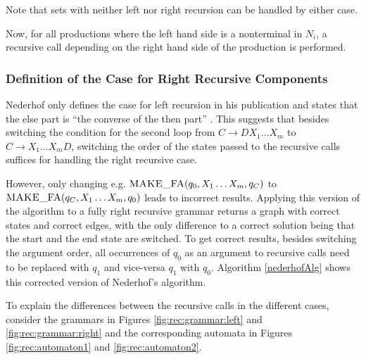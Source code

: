 Note that sets with neither left nor right recursion can be handled by either case.

Now, for all productions where the left hand side is a nonterminal in $N_i$, a recursive call depending on the right hand side of the production is performed. 

\subsubsection{Definition of the Case for Right Recursive Components}

Nederhof only defines the case for left recursion in his publication and states that the else part is \enquote{the converse of the then part} \cite{nederhof}. This suggests that besides switching the condition for the second loop from $C \rightarrow DX_1 \ldots X_m$ to  $C \rightarrow X_1 \ldots X_mD$, switching the order of the states passed to the recursive calls suffices for handling the right recursive case.

However, only changing e.g. $\textproc{MAKE\_FA}(q_0, X_1 \ldots X_m, q_C)$ to $\textproc{MAKE\_FA}(q_C, X_1 \ldots X_m, q_0)$ leads to incorrect results. Applying this version of the algorithm to a fully right recursive grammar returns a graph with correct states and correct edges, with the only difference to a correct solution being that the start and the end state are switched. To get correct results, besides switching the argument order, all occurrences of $q_0$ as an argument to recursive calls need to be replaced with $q_1$ and vice-versa $q_1$ with $q_0$. Algorithm \ref{nederhofAlg} shows this corrected version of Nederhof's algorithm.

To explain the differences between the recursive calls in the different cases, consider the grammars in Figures \ref{fig:rec:grammar:left} and \ref{fig:rec:grammar:right} and the corresponding automata in Figures \ref{fig:rec:automaton1} and \ref{fig:rec:automaton2}.

